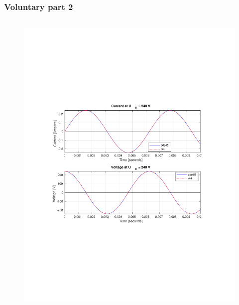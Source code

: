 \documentclass[aspectratio=1610]{beamer}
\begin{document}
\begin{frame}
\frametitle{Voluntary part 2}
	\begin{columns}
			\begin{figure}
				\includegraphics[scale=0.7]{figs/voluntary_2_240V.pdf}
			\end{figure}
	\end{columns}
\end{frame}
\end{document}
